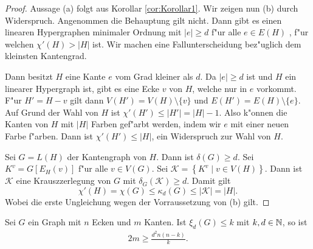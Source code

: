 \begin{proof}
  Aussage (a) folgt aus Korollar \ref{cor:Korollar1}.  
  Wir zeigen nun (b) durch Widerspruch. Angenommen die Behauptung gilt nicht. Dann gibt es einen linearen Hypergraphen minimaler Ordnung mit $|e| \geq d$ f"ur alle $e\in E(H)$ , f"ur welchen $\chi'(H) > |H|$ ist. 
  Wir machen eine Fallunterscheidung bez"uglich dem kleinsten Kantengrad.

   Dann besitzt $H$ eine Kante $e$ vom Grad kleiner als $d$. Da $|e| \geq d$ ist und $H$ ein linearer Hypergraph ist, gibt es eine Ecke $v$ von $H$, welche nur in $e$ vorkommt.
  F"ur $H' = H-v$ gilt dann $V(H') = V(H) \setminus \{v\}$ und $E(H') = E(H) \setminus \{e\}$. Auf Grund der Wahl von $H$ ist $\chi'(H') \leq |H'| = |H|-1$. Also k"onnen die Kanten von $H$ mit $|H|$ Farben gef"arbt werden, indem wir $e$ mit einer neuen Farbe f"arben. 
  Dann ist $\chi'(H') \leq |H|$, ein Widerspruch zur Wahl von $H$. 

   Sei $G=L(H)$ der Kantengraph von $H$. Dann ist $\delta(G) \geq d$. 
  Sei $K^{v} = G[E_{H}(v)]$ f"ur alle $v\in V(G)$. Sei $\mathcal{K}=\left\{ K^{v} \;|\; v \in V(H) \right\}$. 
  Dann ist $\mathcal{K}$ eine Krauszzerlegung von $G$ mit $\delta_{G}(\mathcal{K}) \geq d$. Damit gilt
  \begin{equation*}
    \chi'(H) = \chi(G) \leq \kappa_{d}(G) \leq |\mathcal{K}| = |H|.
  \end{equation*}
  Wobei die erste Ungleichung wegen der Vorraussetzung von (b) gilt.
\end{proof}

\begin{theorem}
  Sei $G$ ein Graph mit $n$ Ecken und $m$ Kanten. Ist $\xi_{d}(G) \leq k$ mit $k,d\in{\mathbb{N}}$, so ist
  \begin{align}
    2m \geq \frac{d^{2}n(n-k)}{k}.
    \label{eq:xikantenineq}
  \end{align}
  \label{thm:xikantenschranke}
\end{theorem}

